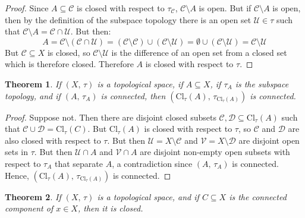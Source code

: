 \documentclass{article}
\theoremstyle{plain}
\newtheorem{theorem}{Theorem}[section]
\theoremstyle{normal}
\begin{document}
        \begin{proof}
            Since $A\subseteq\mathcal{C}$ is closed with respect to
            $\tau_{\mathcal{C}}$, $\mathcal{C}\setminus{A}$ is open. But
            if $\mathcal{C}\setminus{A}$ is open, then by the definition of the
            subspace topology there is an open set $\mathcal{U}\in\tau$ such
            that $\mathcal{C}\setminus{A}=\mathcal{C}\cap\mathcal{U}$.
            But then:
            \begin{equation}
                A=\mathcal{C}\setminus(\mathcal{C}\cap\mathcal{U})
                    =(\mathcal{C}\setminus\mathcal{C})
                        \cup(\mathcal{C}\setminus\mathcal{U})
                    =\emptyset\cup(\mathcal{C}\setminus\mathcal{U})
                    =\mathcal{C}\setminus\mathcal{U}
            \end{equation}
            But $\mathcal{C}\subseteq{X}$ is closed, so
            $\mathcal{C}\setminus\mathcal{U}$ is the difference of an open set
            from a closed set which is therefore closed. Therefore $A$ is
            closed with respect to $\tau$.
        \end{proof}
        \begin{theorem}
            If $(X,\,\tau)$ is a topological space, if $A\subseteq{X}$, if
            $\tau_{A}$ is the subspace topology, and if $(A,\,\tau_{A})$ is
            connected, then
            $(\textrm{Cl}_{\tau}(A),\,\tau_{\textrm{Cl}_{\tau}(A)})$ is
            connected.
        \end{theorem}
        \begin{proof}
            Suppose not. Then there are disjoint closed subsets
            $\mathcal{C},\mathcal{D}\subseteq\textrm{Cl}_{\tau}(A)$ such that
            $\mathcal{C}\cup\mathcal{D}=\textrm{Cl}_{\tau}(C)$. But
            $\textrm{Cl}_{\tau}(A)$ is closed with respect to $\tau$, so
            $\mathcal{C}$ and $\mathcal{D}$ are also closed with respect
            to $\tau$. But then
            $\mathcal{U}=X\setminus\mathcal{C}$ and
            $\mathcal{V}=X\setminus\mathcal{D}$ are disjoint open sets in
            $\tau$. But then $\mathcal{U}\cap{A}$ and
            $\mathcal{V}\cap{A}$ are disjoint non-empty open subsets with
            respect to $\tau_{A}$ that separate $A$, a contradiction since
            $(A,\,\tau_{A})$ is connected. Hence,
            $(\textrm{Cl}_{\tau}(A),\,\tau_{\textrm{Cl}_{\tau}(A)})$ is
            connected.
        \end{proof}
        \begin{theorem}
            If $(X,\,\tau)$ is a topological space, and if $C\subseteq{X}$ is
            the connected component of $x\in{X}$, then it is closed.
        \end{theorem}
\end{document}
